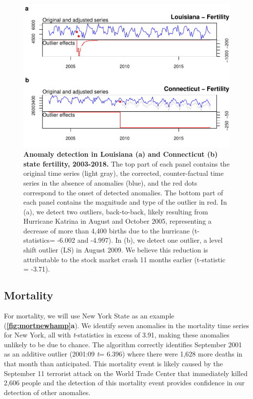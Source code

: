 \documentclass[12pt]{article}
\begin{document}
\begin{figure}
\centering
\includegraphics{manuscript_files/figure-latex/FertilityAnomalies-1.pdf}
\caption{\textbf{Anomaly detection in Louisiana (a) and Connecticut (b) state fertility, 2003-2018.}
The top part of each panel contains the original time series (light
gray), the corrected, counter-factual time series in the absence of
anomalies (blue), and the red dots correspond to the onset of detected
anomalies. The bottom part of each panel contains the magnitude and type
of the outlier in red. In (a), we detect two outliers, back-to-back,
likely resulting from Hurricane Katrina in August and October 2005,
representing a decrease of more than 4,400 births due to the hurricane
(t-statistics= -6.002 and -4.997). In (b), we detect one outlier, a
level shift outlier (LS) in August 2009. We believe this reduction is
attributable to the stock market crash 11 months earlier (t-statistic =
-3.71). \label{fig:fertla}}
\end{figure}

\hypertarget{mortality}{%
\subsection{Mortality}\label{mortality}}

For mortality, we will use New York State as an example
(\textbf{\autoref{fig:mortnewhamp}a}). We identify seven anomalies in
the mortality time series for New York, all with \emph{t}-statistics in
excess of 3.91, making these anomalies unlikely to be due to chance. The
algorithm correctly identifies September 2001 as an additive outlier
(2001:09 \emph{t}= 6.396) where there were 1,628 more deaths in that
month than anticipated. This mortality event is likely caused by the
September 11 terrorist attack on the World Trade Center that immediately
killed 2,606 people and the detection of this mortality event provides
confidence in our detection of other anomalies.
\end{document}
